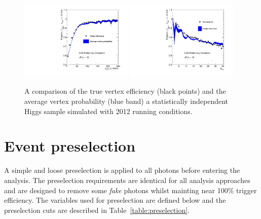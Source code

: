 \begin{figure}
  \includegraphics[width=0.48\textwidth]{ch3_comm_anal_comps/plots/vertex_bdt_prob_efficiency_pt.pdf}
  \includegraphics[width=0.48\textwidth]{ch3_comm_anal_comps/plots/vertex_bdt_prob_efficiency_nvtx.pdf}
  \caption{A comparison of the true vertex efficiency (black points) and the average vertex probability (blue band) a statistically independent \MC Higgs sample simulated with 2012 running conditions.}
  \label{fig:vertex_bdt_prob_efficiency}
\end{figure}

\section{Event preselection}
\label{sec:photon_presel}

A simple and loose preselection is applied to all photons before entering the analysis. The preselection requirements are identical for all analysis approaches and are designed to remove some \emph{fake} photons whilst mainting near 100\% trigger efficiency. The variables used for preselection are defined below and the preselection cuts are described in Table~\ref{table:preselection}.

